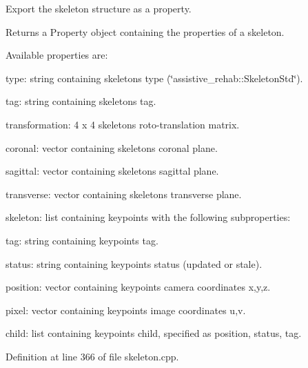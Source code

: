 Export the skeleton structure as a property. 

\begin{DoxyReturn}{Returns}
a Property object containing the properties of a skeleton.
\end{DoxyReturn}
Available properties are\+:
\begin{DoxyItemize}
\item type\+: string containing skeleton\textquotesingle{}s type (\char`\"{}assistive\+\_\+rehab\+::\+Skeleton\+Std\char`\"{}).
\item tag\+: string containing skeleton\textquotesingle{}s tag.
\item transformation\+: 4 x 4 skeleton\textquotesingle{}s roto-\/translation matrix.
\item coronal\+: vector containing skeleton\textquotesingle{}s coronal plane.
\item sagittal\+: vector containing skeleton\textquotesingle{}s sagittal plane.
\item transverse\+: vector containing skeleton\textquotesingle{}s transverse plane.
\item skeleton\+: list containing keypoints with the following subproperties\+:
\begin{DoxyItemize}
\item tag\+: string containing keypoint\textquotesingle{}s tag.
\item status\+: string containing keypoint\textquotesingle{}s status (updated or stale).
\item position\+: vector containing keypoint\textquotesingle{}s camera coordinates x,y,z.
\item pixel\+: vector containing keypoint\textquotesingle{}s image coordinates u,v.
\item child\+: list containing keypoint\textquotesingle{}s child, specified as position, status, tag. 
\end{DoxyItemize}
\end{DoxyItemize}

Definition at line 366 of file skeleton.\+cpp.


